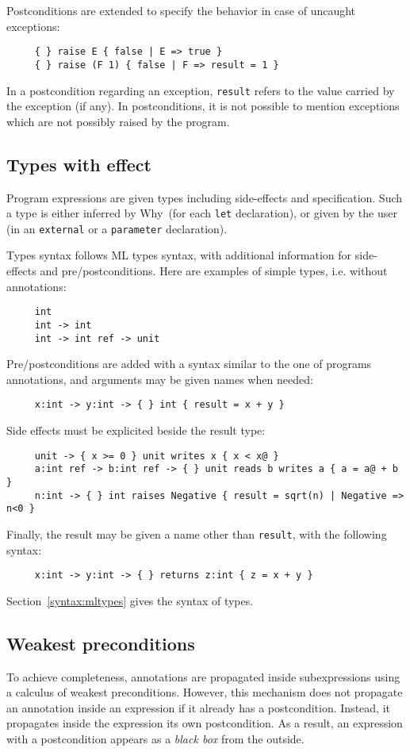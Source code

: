 \documentclass[a4paper,12pt]{report}
\makeatletter
\newcommand{\why}{\textsf{Why}}
\newcommand{\indextt}[1]{\index{#1@\texttt{#1}}}
\makeatother
\begin{document}
Postconditions are extended to specify the behavior in case of
uncaught exceptions:
\begin{verbatim}
     { } raise E { false | E => true }
     { } raise (F 1) { false | F => result = 1 }
\end{verbatim}
In a postcondition regarding an exception, \texttt{result} refers to
the value carried by the exception (if any).
In postconditions, it is not possible to mention exceptions which
are not possibly raised by the program.


\subsection{Types with effect}
\label{types}

Program expressions are given types including side-effects and
specification. Such a type is either inferred by \why\ (for each
\texttt{let} declaration), or given by the user (in an
\texttt{external} or a \texttt{parameter} declaration).

Types syntax follows ML types syntax, with additional information for
side-effects and pre/postconditions. Here are examples of simple types,
i.e. without annotations:
\begin{verbatim}
     int
     int -> int
     int -> int ref -> unit
\end{verbatim}
Pre/postconditions are added with a syntax similar to the one of
programs annotations, and arguments may be given names when needed:
\begin{verbatim}
     x:int -> y:int -> { } int { result = x + y }
\end{verbatim}
Side effects must be explicited beside the result type:
\indextt{reads}\indextt{writes}\indextt{raises}%
\begin{verbatim}
     unit -> { x >= 0 } unit writes x { x < x@ }
     a:int ref -> b:int ref -> { } unit reads b writes a { a = a@ + b }
     n:int -> { } int raises Negative { result = sqrt(n) | Negative => n<0 }
\end{verbatim}
Finally, the result may be given a name other than \texttt{result},
with the following syntax:
\begin{verbatim}
     x:int -> y:int -> { } returns z:int { z = x + y }
\end{verbatim}
Section~\ref{syntax:mltypes} gives the syntax of types.


\subsection{Weakest preconditions}
\label{wp}
To achieve completeness, annotations are propagated inside
subexpressions using a calculus of weakest preconditions.
However, this mechanism does not propagate an annotation inside an
expression if it already has a postcondition. Instead, it propagates
inside the expression its own postcondition. As a result, an
expression with a postcondition appears as a \emph{black box} from the
outside. 
\end{document}
